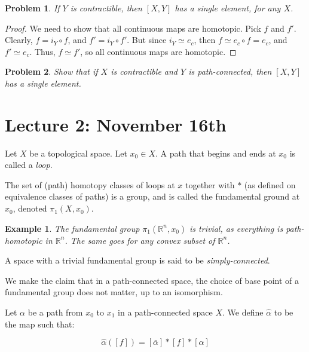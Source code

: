 \documentclass[10pt, oneside]{amsart}
\newtheorem{prob}{Problem}
\newtheorem{ex}{Example}
\begin{document}
    \begin{prob}
      If $Y$ is contractible, then $[X, Y]$ has a single element, for any $X$.
    \end{prob}

    \begin{proof}
      We need to show that all continuous maps are homotopic. Pick $f$ and $f'$. Clearly, $f = i_Y \circ f$, and $f' = i_Y \circ f'$. But since $i_Y \simeq e_c$, then $f \simeq e_c \circ f = e_c$, and
      $f' \simeq e_c$. Thus, $f \simeq f'$, so all continuous maps are homotopic.
    \end{proof}

    \begin{prob}
      Show that if $X$ is contractible and $Y$ is path-connected, then $[X, Y]$ has a single element.
    \end{prob}

    \section{Lecture 2: November 16th}

    \begin{def}
      Let $X$ be a topological space. Let $x_0 \in X$. A path that begins and ends at $x_0$ is called a \textit{loop}.
    \end{def}

    \begin{def}
    The set of (path) homotopy classes of loops at $x$ together with $*$ (as defined on equivalence classes of paths) is a group, and is called the fundamental ground at $x_0$, denoted
    $\pi_1(X, x_0)$.
    \end{def}

    \begin{ex}
      The fundamental group $\pi_1(\mathbb{R}^{n}, x_0)$ is trivial, as everything is path-homotopic in $\mathbb{R}^{n}$. The same goes for any convex subset of $\mathbb{R}^{n}$.
    \end{ex}

    \begin{def}
      A space with a trivial fundamental group is said to be \textit{simply-connected}.
    \end{def}

    We make the claim that in a path-connected space, the choice of base point of a fundamental group does not matter, up to an isomorphism.
    \newline

    \begin{def}
      Let $\alpha$ be a path from $x_0$ to $x_1$ in a path-connected space $X$. We define $\hat{\alpha}$ to be the map such that:

      $$\hat{\alpha}( [f] ) = [\bar{\alpha}] * [f] * [\alpha]$$
      \end{def}
\end{document}
